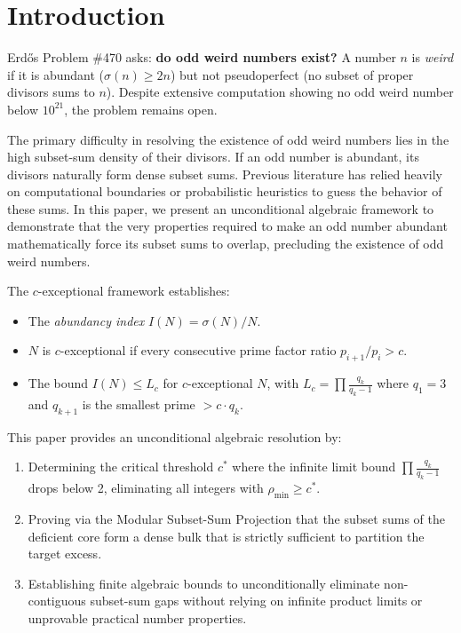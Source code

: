 \documentclass{erdos_paper}
\begin{document}
\section{Introduction}
Erdős Problem \#470 asks: \textbf{do odd weird numbers exist?} A number $n$ is \textit{weird} if it is abundant ($\sigma(n) \ge 2n$) but not pseudoperfect (no subset of proper divisors sums to $n$). Despite extensive computation showing no odd weird number below $10^{21}$, the problem remains open. 

The primary difficulty in resolving the existence of odd weird numbers lies in the high subset-sum density of their divisors. If an odd number is abundant, its divisors naturally form dense subset sums. Previous literature has relied heavily on computational boundaries or probabilistic heuristics to guess the behavior of these sums. In this paper, we present an unconditional algebraic framework to demonstrate that the very properties required to make an odd number abundant mathematically force its subset sums to overlap, precluding the existence of odd weird numbers.

The $c$-exceptional framework establishes:
\begin{itemize}
    \item The \textit{abundancy index} $I(N) = \sigma(N)/N$.
    \item $N$ is $c$-exceptional if every consecutive prime factor ratio $p_{i+1}/p_i > c$.
    \item The bound $I(N) \le L_c$ for $c$-exceptional $N$, with $L_c = \prod \frac{q_k}{q_k-1}$ where $q_1 = 3$ and $q_{k+1}$ is the smallest prime $> c \cdot q_k$.
\end{itemize}

This paper provides an unconditional algebraic resolution by:
\begin{enumerate}
    \item Determining the critical threshold $c^{\ast}$ where the infinite limit bound $\prod \frac{q_k}{q_k-1}$ drops below 2, eliminating all integers with $\rho_{\min} \ge c^{\ast}$.
    \item Proving via the Modular Subset-Sum Projection that the subset sums of the deficient core form a dense bulk that is strictly sufficient to partition the target excess.
    \item Establishing finite algebraic bounds to unconditionally eliminate non-contiguous subset-sum gaps without relying on infinite product limits or unprovable practical number properties.
\end{enumerate}
\end{document}
